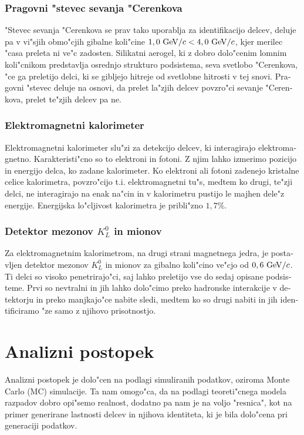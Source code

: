 \begin{otherlanguage}{slovene}
\subsubsection{Pragovni "stevec sevanja "Cerenkova}
"Stevec sevanja "Cerenkova se prav tako uporablja za identifikacijo delcev, deluje pa v vi"sjih obmo"cjih gibalne koli"cine $1,0\mathrm{~GeV}/c < 4,0\mathrm{~GeV}/c$, kjer merilec "casa preleta ni ve"c zadosten. Silikatni aerogel, ki z dobro dolo"cenim lomnim koli"cnikom predstavlja osrednjo strukturo podsistema, seva svetlobo "Cerenkova, "ce ga preletijo delci, ki se gibljejo hitreje od svetlobne hitrosti v tej snovi. Pragovni "stevec deluje na osnovi, da prelet la"zjih delcev povzro"ci sevanje "Cerenkova, prelet te"zjih delcev pa ne.

\subsubsection{Elektromagnetni kalorimeter}
Elektromagnetni kalorimeter slu"zi za detekcijo delcev, ki interagirajo elektromagnetno. Karakteristi"cno so to elektroni in fotoni. Z njim lahko izmerimo pozicijo in energijo delca, ko zadane kalorimeter. Ko elektroni ali fotoni zadenejo kristalne celice kalorimetra, povzro"cijo t.i. elektromagnetni tu"s, medtem ko drugi, te"zji delci, ne interagirajo na enak na"cin in v kalorimetru pustijo le majhen dele"z energije. Energijska lo"cljivost kalorimetra je pribli"zno $1,7\%$.

\subsubsection{Detektor mezonov $K_L^0$ in mionov}
Za elektromagnetnim kalorimetrom, na drugi strani magnetnega jedra, je postavljen detektor mezonov $K_L^0$ in mionov za gibalno koli"cino ve"cjo od $0,6\mathrm{~GeV}/c$. Ti delci so visoko penetrirajo"ci, saj lahko preletijo vse do sedaj opisane podsisteme. Prvi so nevtralni in jih lahko dolo"cimo preko hadronske interakcije v detektorju in preko manjkajo"ce nabite sledi, medtem ko so drugi nabiti in jih identificiramo "ze samo z njihovo prisotnostjo.

\section{Analizni postopek}
Analizni postopek je dolo"cen na podlagi simuliranih podatkov, oziroma Monte Carlo (MC) simulacije. Ta nam omogo"ca, da na podlagi teoreti"cnega modela razpadov dobro opi"semo realnost, dodatno pa nam je na voljo "resnica", kot na primer generirane lastnosti delcev in njihova identiteta, ki je bila dolo"cena pri generaciji podatkov.


\end{otherlanguage}
